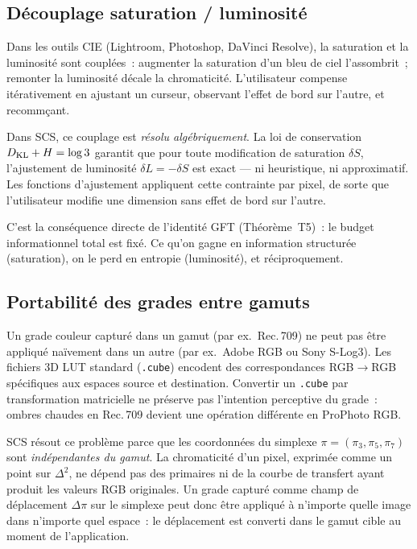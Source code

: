 \documentclass[12pt,a4paper]{article}
\begin{document}
\subsection{D\'ecouplage saturation / luminosit\'e}

Dans les outils CIE (Lightroom, Photoshop, DaVinci Resolve), la
saturation et la luminosit\'e sont coupl\'ees~: augmenter la saturation
d'un bleu de ciel l'assombrit~; remonter la luminosit\'e d\'ecale la
chromaticit\'e. L'utilisateur compense it\'erativement en ajustant un
curseur, observant l'effet de bord sur l'autre, et recomm\c{c}ant.

Dans SCS, ce couplage est \emph{r\'esolu alg\'ebriquement}. La loi
de conservation $D_{\mathrm{KL}} + H = \log 3$ garantit que pour toute modification
de saturation $\delta S$, l'ajustement de luminosit\'e
$\delta L = -\delta S$ est exact --- ni heuristique, ni approximatif.
Les fonctions d'ajustement appliquent cette contrainte par pixel, de
sorte que l'utilisateur modifie une dimension sans effet de bord sur
l'autre.

C'est la cons\'equence directe de l'identit\'e GFT (Th\'eor\`eme~T5)~:
le budget informationnel total est fix\'e. Ce qu'on gagne en
information structur\'ee (saturation), on le perd en entropie
(luminosit\'e), et r\'eciproquement.

\subsection{Portabilit\'e des grades entre gamuts}

Un grade couleur captur\'e dans un gamut (par ex.\ Rec.\,709) ne peut
pas \^etre appliqu\'e na\"ivement dans un autre (par ex.\ Adobe RGB ou
Sony S-Log3). Les fichiers 3D LUT standard (\texttt{.cube}) encodent
des correspondances RGB$\to$RGB sp\'ecifiques aux espaces source et
destination. Convertir un \texttt{.cube} par transformation matricielle
ne pr\'eserve pas l'intention perceptive du grade~: \og ombres
chaudes \fg{} en Rec.\,709 devient une op\'eration diff\'erente en
ProPhoto RGB.

SCS r\'esout ce probl\`eme parce que les coordonn\'ees du simplexe
$\pi = (\pi_3, \pi_5, \pi_7)$ sont \emph{ind\'ependantes du gamut}.
La chromaticit\'e d'un pixel, exprim\'ee comme un point sur $\Delta^2$,
ne d\'epend pas des primaires ni de la courbe de transfert ayant
produit les valeurs RGB originales. Un grade captur\'e comme champ de
d\'eplacement $\Delta\pi$ sur le simplexe peut donc \^etre appliqu\'e
\`a n'importe quelle image dans n'importe quel espace~: le
d\'eplacement est converti dans le gamut cible au moment de
l'application.
\end{document}
